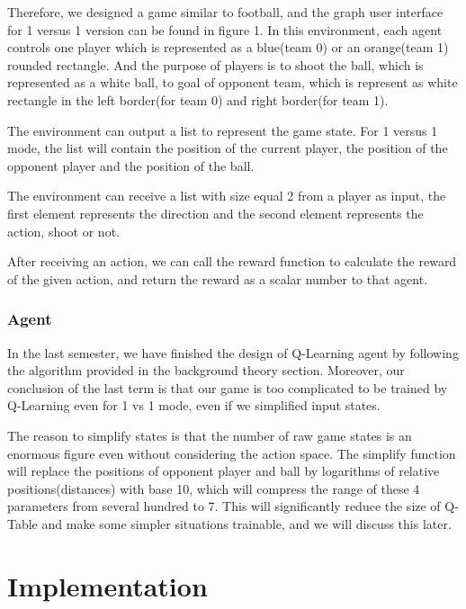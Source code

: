 \documentclass[12pt]{article}
\begin{document}
Therefore, we designed a game similar to football, and the graph user interface for 1 versus 1 version can be found in figure 1. In this environment, each agent controls one player which is represented as a blue(team 0) or an orange(team 1) rounded rectangle. And the purpose of players is to shoot the ball, which is represented as a white ball, to goal of opponent team, which is represent as white rectangle in the left border(for team 0) and right border(for team 1).

The environment can output a list to represent the game state. For 1 versus 1 mode, the list will contain the position of the current player, the position of the opponent player and the position of the ball.

The environment can receive a list with size equal 2 from a player as input, the first element represents the direction and the second element represents the action, shoot or not. 

After receiving an action, we can call the reward function to calculate the reward of the given action, and return the reward as a scalar number to that agent.

\subsubsection{Agent}

In the last semester, we have finished the design of Q-Learning agent by following the algorithm provided in the background theory section. Moreover, our conclusion of the last term is that our game is too complicated to be trained by Q-Learning even for 1 vs 1 mode, even if we simplified input states.

The reason to simplify states is that the number of raw game states is an enormous figure even without considering the action space. The simplify function will replace the positions of opponent player and ball by logarithms of relative positions(distances) with base 10, which will compress the range of these 4 parameters from several hundred to 7. This will significantly reduce the size of Q-Table and make some simpler situations trainable, and we will discuss this later.



\section{Implementation}
\end{document}
